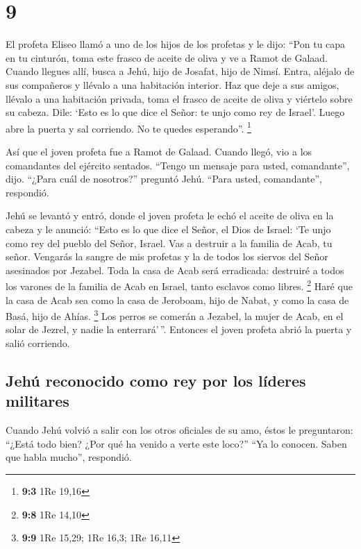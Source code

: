 \hypertarget{section-8}{%
\section{9}\label{section-8}}

 El profeta Eliseo llamó a uno de los hijos de los
profetas y le dijo: ``Pon tu capa en tu cinturón, toma este frasco de
aceite de oliva y ve a Ramot de Galaad.  Cuando llegues
allí, busca a Jehú, hijo de Josafat, hijo de Nimsí. Entra, aléjalo de
sus compañeros y llévalo a una habitación interior. Haz que deje a sus
amigos, llévalo a una habitación privada,  toma el frasco
de aceite de oliva y viértelo sobre su cabeza. Dile: `Esto es lo que
dice el Señor: te unjo como rey de Israel'. Luego abre la puerta y sal
corriendo. No te quedes esperando''. \footnote{\textbf{9:3} 1Re 19,16}

 Así que el joven profeta fue a Ramot de Galaad.
 Cuando llegó, vio a los comandantes del ejército
sentados. ``Tengo un mensaje para usted, comandante'', dijo. ``¿Para
cuál de nosotros?'' preguntó Jehú. ``Para usted, comandante'',
respondió.

 Jehú se levantó y entró, donde el joven profeta le echó
el aceite de oliva en la cabeza y le anunció: ``Esto es lo que dice el
Señor, el Dios de Israel: `Te unjo como rey del pueblo del Señor,
Israel.  Vas a destruir a la familia de Acab, tu señor.
Vengarás la sangre de mis profetas y la de todos los siervos del Señor
asesinados por Jezabel.  Toda la casa de Acab será
erradicada: destruiré a todos los varones de la familia de Acab en
Israel, tanto esclavos como libres. \footnote{\textbf{9:8} 1Re 14,10}
 Haré que la casa de Acab sea como la casa de Jeroboam,
hijo de Nabat, y como la casa de Basá, hijo de Ahías. \footnote{\textbf{9:9}
  1Re 15,29; 1Re 16,3; 1Re 16,11}  Los perros se comerán
a Jezabel, la mujer de Acab, en el solar de Jezrel, y nadie la
enterrará'\,''. Entonces el joven profeta abrió la puerta y salió
corriendo.

\hypertarget{jehuxfa-reconocido-como-rey-por-los-luxedderes-militares}{%
\subsection{Jehú reconocido como rey por los líderes
militares}\label{jehuxfa-reconocido-como-rey-por-los-luxedderes-militares}}

 Cuando Jehú volvió a salir con los otros oficiales de su
amo, éstos le preguntaron: ``¿Está todo bien? ¿Por qué ha venido a verte
este loco?'' ``Ya lo conocen. Saben que habla mucho'', respondió.


